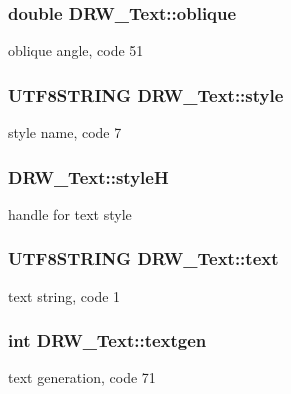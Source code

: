 \subsubsection[{oblique}]{\setlength{\rightskip}{0pt plus 5cm}double D\+R\+W\+\_\+\+Text\+::oblique}\label{class_d_r_w___text_ab273757633e67aa82b17b6b1141c8b98}
oblique angle, code 51 \hypertarget{class_d_r_w___text_a11fa7c1b5a6fccafe2991bad2413cfa8}{}
\subsubsection[{style}]{\setlength{\rightskip}{0pt plus 5cm}U\+T\+F8\+S\+T\+R\+I\+N\+G D\+R\+W\+\_\+\+Text\+::style}\label{class_d_r_w___text_a11fa7c1b5a6fccafe2991bad2413cfa8}
style name, code 7 \hypertarget{class_d_r_w___text_a2bbd98f55b08ef9d9d7011a32c6d94dd}{}
\subsubsection[{style\+H}]{ D\+R\+W\+\_\+\+Text\+::style\+H}\label{class_d_r_w___text_a2bbd98f55b08ef9d9d7011a32c6d94dd}
handle for text style \hypertarget{class_d_r_w___text_a87a40d4523371ee0cc250be0fc8834cd}{}
\subsubsection[{text}]{\setlength{\rightskip}{0pt plus 5cm}U\+T\+F8\+S\+T\+R\+I\+N\+G D\+R\+W\+\_\+\+Text\+::text}\label{class_d_r_w___text_a87a40d4523371ee0cc250be0fc8834cd}
text string, code 1 \hypertarget{class_d_r_w___text_ada45df3aae10844afc1861261e40869e}{}
\subsubsection[{textgen}]{\setlength{\rightskip}{0pt plus 5cm}int D\+R\+W\+\_\+\+Text\+::textgen}\label{class_d_r_w___text_ada45df3aae10844afc1861261e40869e}
text generation, code 71 \hypertarget{class_d_r_w___text_a17468f7c0e1bd0b1c6da87cc9300b7e1}{}
